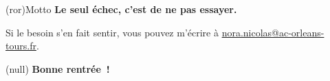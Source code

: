 \documentclass[a4paper, 10pt, garamond]{book}
\begin{document}
\begin{tcn}[cnt](ror){Motto}
	\Large\bfseries
	Le seul échec, c'est de ne pas essayer.
\end{tcn}

\vfill

Si le besoin s'en fait sentir, vous pouvez m'écrire à
\href{nora.nicolas@ac-orleans-tours.fr}{nora.nicolas@ac-orleans-tours.fr}.

\vfill

\begin{tcn}[cnt, boxrule=3pt, sharp corners, valign=center](null){}
	\vspace{-5pt} \Large\bfseries Bonne rentrée~!
\end{tcn}

\vfill
\end{document}
